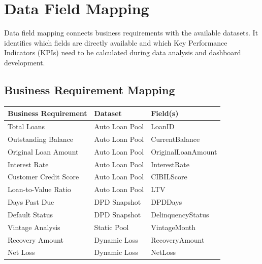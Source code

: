 
\section{Data Field Mapping}

Data field mapping connects business requirements with the available datasets. It identifies which fields are directly available and which Key Performance Indicators (KPIs) need to be calculated during data analysis and dashboard development.

\vspace{0.4cm}

\subsection*{Business Requirement Mapping}

\renewcommand{\arraystretch}{1.4}

\begin{tabularx}{\textwidth}{|p{4.5cm}|p{3.2cm}|X|}
	\hline
	\rowcolor{TableHeader}
	\textbf{Business Requirement} & \textbf{Dataset} & \textbf{Field(s)}\\
	\hline
	
	Total Loans
	&
	Auto Loan Pool
	&
	LoanID
	\\
	\hline
	
	Outstanding Balance
	&
	Auto Loan Pool
	&
	CurrentBalance
	\\
	\hline
	
	Original Loan Amount
	&
	Auto Loan Pool
	&
	OriginalLoanAmount
	\\
	\hline
	
	Interest Rate
	&
	Auto Loan Pool
	&
	InterestRate
	\\
	\hline
	
	Customer Credit Score
	&
	Auto Loan Pool
	&
	CIBILScore
	\\
	\hline
	
	Loan-to-Value Ratio
	&
	Auto Loan Pool
	&
	LTV
	\\
	\hline
	
	Days Past Due
	&
	DPD Snapshot
	&
	DPDDays
	\\
	\hline
	
	Default Status
	&
	DPD Snapshot
	&
	DelinquencyStatus
	\\
	\hline
	
	Vintage Analysis
	&
	Static Pool
	&
	VintageMonth
	\\
	\hline
	
	Recovery Amount
	&
	Dynamic Loss
	&
	RecoveryAmount
	\\
	\hline
	
	Net Loss
	&
	Dynamic Loss
	&
	NetLoss
	\\
	\hline
	
\end{tabularx}

